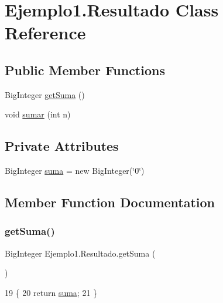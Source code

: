 \hypertarget{class_ejemplo1_1_1_resultado}{}\section{Ejemplo1.\+Resultado Class Reference}
\label{class_ejemplo1_1_1_resultado}
\subsection*{Public Member Functions}
\begin{DoxyCompactItemize}
\item 
Big\+Integer \mbox{\hyperlink{class_ejemplo1_1_1_resultado_ab1b2363ffba06bd9a9552688182bea3b}{get\+Suma}} ()
\item 
void \mbox{\hyperlink{class_ejemplo1_1_1_resultado_a2a8879e3a5c2d5e25191ec99fabe45e6}{sumar}} (int n)
\end{DoxyCompactItemize}
\subsection*{Private Attributes}
\begin{DoxyCompactItemize}
\item 
Big\+Integer \mbox{\hyperlink{class_ejemplo1_1_1_resultado_a2e9f85dff43e5d9db41f8a05219d83fd}{suma}} = new Big\+Integer(\char`\"{}0\char`\"{})
\end{DoxyCompactItemize}


\subsection{Member Function Documentation}
\mbox{\label{class_ejemplo1_1_1_resultado_ab1b2363ffba06bd9a9552688182bea3b}} 
\subsubsection{\texorpdfstring{get\+Suma()}{getSuma()}}
{\footnotesize\ttfamily Big\+Integer Ejemplo1.\+Resultado.\+get\+Suma (\begin{DoxyParamCaption}{ }\end{DoxyParamCaption})\hspace{0.3cm}{\ttfamily [inline]}}


\begin{DoxyCode}
19     \{
20         \textcolor{keywordflow}{return} \mbox{\hyperlink{class_ejemplo1_1_1_resultado_a2e9f85dff43e5d9db41f8a05219d83fd}{suma}};
21     \}
\end{DoxyCode}
\mbox{\label{class_ejemplo1_1_1_resultado_a2a8879e3a5c2d5e25191ec99fabe45e6}} 
